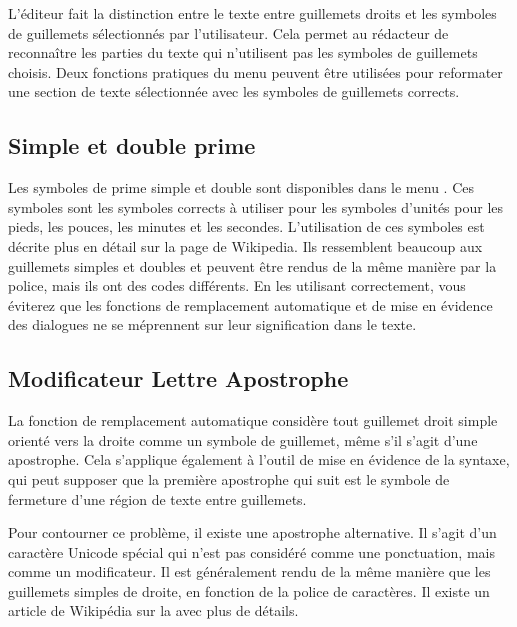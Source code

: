 \documentclass[a4paper,11pt,french]{sphinxmanual}
\begin{document}
\sphinxAtStartPar
L’éditeur fait la distinction entre le texte entre guillemets droits et les symboles de guillemets sélectionnés par l’utilisateur. Cela permet au rédacteur de reconnaître les parties du texte qui n’utilisent pas les symboles de guillemets choisis. Deux fonctions pratiques du menu  peuvent être utilisées pour reformater une section de texte sélectionnée avec les symboles de guillemets corrects.


\subsection{Simple et double prime}
\label{\detokenize{usage_typography:single-and-double-prime}}
\sphinxAtStartPar
Les symboles de prime simple et double sont disponibles dans le menu . Ces symboles sont les symboles corrects à utiliser pour les symboles d’unités pour les pieds, les pouces, les minutes et les secondes. L’utilisation de ces symboles est décrite plus en détail sur la page  de Wikipedia. Ils ressemblent beaucoup aux guillemets simples et doubles et peuvent être rendus de la même manière par la police, mais ils ont des codes différents. En les utilisant correctement, vous éviterez que les fonctions de remplacement automatique et de mise en évidence des dialogues ne se méprennent sur leur signification dans le texte.


\subsection{Modificateur Lettre Apostrophe}
\label{\detokenize{usage_typography:id1}}
\sphinxAtStartPar
La fonction de remplacement automatique considère tout guillemet droit simple orienté vers la droite comme un symbole de guillemet, même s’il s’agit d’une apostrophe. Cela s’applique également à l’outil de mise en évidence de la syntaxe, qui peut supposer que la première apostrophe qui suit est le symbole de fermeture d’une région de texte entre guillemets.

\sphinxAtStartPar
Pour contourner ce problème, il existe une apostrophe alternative. Il s’agit d’un caractère Unicode spécial qui n’est pas considéré comme une ponctuation, mais comme un modificateur. Il est généralement rendu de la même manière que les guillemets simples de droite, en fonction de la police de caractères. Il existe un article de Wikipédia sur la  avec plus de détails.
\end{document}
